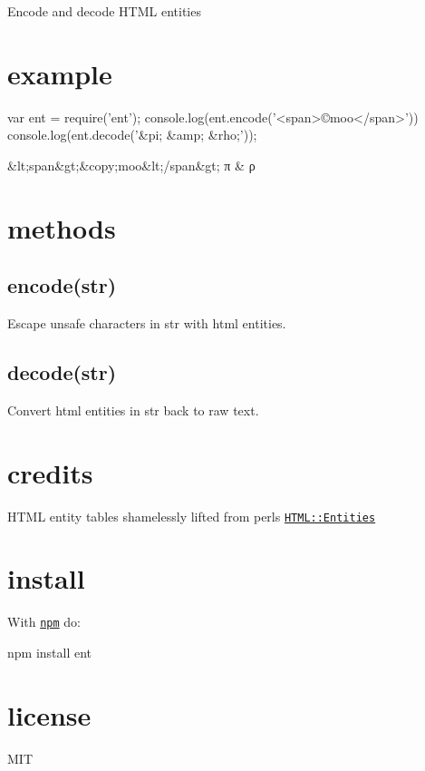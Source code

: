 Encode and decode H\+T\+ML entities

\href{http://ci.testling.com/substack/node-ent}{\tt }

\href{http://travis-ci.org/substack/node-ent}{\tt }

\section*{example}


\begin{DoxyCode}
var ent = require('ent');
console.log(ent.encode('<span>©moo</span>'))
console.log(ent.decode('&pi; &amp; &rho;'));
\end{DoxyCode}



\begin{DoxyCode}
&lt;span&gt;&copy;moo&lt;/span&gt;
π & ρ
\end{DoxyCode}




\section*{methods}

\subsection*{encode(str)}

Escape unsafe characters in {\ttfamily str} with html entities.

\subsection*{decode(str)}

Convert html entities in {\ttfamily str} back to raw text.

\section*{credits}

H\+T\+ML entity tables shamelessly lifted from perl\textquotesingle{}s \href{http://cpansearch.perl.org/src/GAAS/HTML-Parser-3.68/lib/HTML/Entities.pm}{\tt H\+T\+M\+L\+::\+Entities}

\section*{install}

With \href{https://npmjs.org}{\tt npm} do\+:


\begin{DoxyCode}
npm install ent
\end{DoxyCode}


\section*{license}

M\+IT 